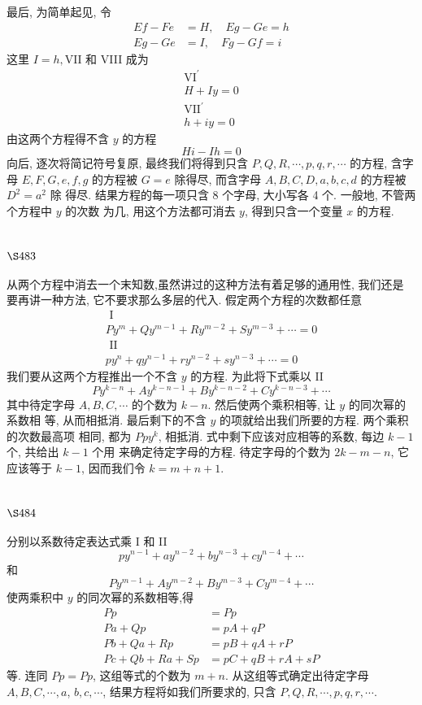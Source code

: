 最后, 为简单起见, 令
\[
\begin{array}{cc}
E f-F e & =H, \quad E g-G e=h \\
E g-G e & =I, \quad F g-G f=i
\end{array}
\]
这里 $I=h, \mathrm{VII}$ 和 VIII 成为
\[
\begin{gathered}
\mathrm{VI}^{\prime} \\
H+I y=0 \\
\mathrm{VII^{ \prime }} \\
h+i y=0
\end{gathered}
\]
由这两个方程得不含 $y$ 的方程
\[
H i-I h=0
\]
向后, 逐次将简记符号复原, 最终我们将得到只含 $P, Q, R, \cdots, p, q, r, \cdots$ 的方程, 含字母 $E, F, G, e, f, g$ 的方程被 $G=e$ 除得尽, 而含字母 $A, B, C, D, a, b, c, d$ 的方程被 $D^{2}=a^{2}$ 除 得尽. 结果方程的每一项只含 8 个字母, 大小写各 4 个. 一般地, 不管两个方程中 $y$ 的次数 为几, 用这个方法都可消去 $y$, 得到只含一个变量 $x$ 的方程.

\section{$\S 483$}

从两个方程中消去一个末知数,虽然讲过的这种方法有着足够的通用性, 我们还是 要再讲一种方法, 它不要求那么多层的代入. 假定两个方程的次数都任意
\[
\begin{gathered}
\text { I } \\
P y^{m}+Q y^{m-1}+R y^{m-2}+S y^{m-3}+\cdots=0 \\
\text { II } \\
p y^{n}+q y^{n-1}+r y^{n-2}+s y^{n-3}+\cdots=0
\end{gathered}
\]
我们要从这两个方程推出一个不含 $y$ 的方程. 为此将下式乘以 II
\[
P y^{k-n}+A y^{k-n-1}+B y^{k-n-2}+C y^{k-n-3}+\cdots
\]
其中待定字母 $A, B, C, \cdots$ 的个数为 $k-n$. 然后使两个乘积相等, 让 $y$ 的同次幂的系数相 等, 从而相抵消. 最后剩下的不含 $y$ 的项就给出我们所要的方程. 两个乘积的次数最高项 相同, 都为 $P p y^{k}$, 相抵消. 式中剩下应该对应相等的系数, 每边 $k-1$ 个, 共给出 $k-1$ 个用 来确定待定字母的方程. 待定字母的个数为 $2 k-m-n$, 它应该等于 $k-1$, 因而我们令 $k=m+n+1$. 

\section{$\S 484$}

分别以系数待定表达式乘 I 和 II
\[
p y^{n-1}+a y^{n-2}+b y^{n-3}+c y^{n-4}+\cdots
\]
和
\[
P y^{m-1}+A y^{m-2}+B y^{m-3}+C y^{m-4}+\cdots
\]
使两乘积中 $y$ 的同次幂的系数相等,得
\[
\begin{aligned}
P p & =P p \\
P a+Q p & =p A+q P \\
P b+Q a+R p & =p B+q A+r P \\
P c+Q b+R a+S p & =p C+q B+r A+s P
\end{aligned}
\]
等. 连同 $P p=P p$, 这组等式的个数为 $m+n$. 从这组等式确定出待定字母 $A, B, C, \cdots, a$, $b, c, \cdots$, 结果方程将如我们所要求的, 只含 $P, Q, R, \cdots, p, q, r, \cdots$.

